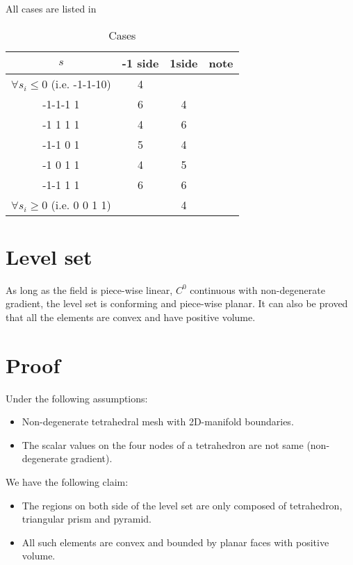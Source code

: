 \documentclass[9pt]{extarticle}
\begin{document}
All cases are listed in~

\begin{table}[htb]
  \centering
  \begin{tabular}{|c|ccc|}
    \hline
    $s$                                 & -1 side & 1side & note \\
    \hline
    $\forall s_i \leq 0$ (i.e. -1-1-10) & 4       &       &      \\
    \hline
    -1-1-1 1                            & 6       & 4     &      \\
    -1 1 1 1                            & 4       & 6     &      \\
    \hline
    -1-1 0 1                            & 5       & 4     &      \\
    -1 0 1 1                            & 4       & 5     &      \\
    \hline
    -1-1 1 1                            & 6       & 6     &      \\
    \hline
    $\forall s_i \geq 0$ (i.e. 0 0 1 1) &         & 4     &      \\
    \hline
  \end{tabular}
  \caption{Cases}
  \label{tab:cases}
\end{table}

\section{Level set}

As long as the field is piece-wise linear, $C^0$ continuous with
non-degenerate gradient, the level set is conforming and piece-wise
planar.  It can also be proved that all the elements are convex and
have positive volume.

\section{Proof}
\label{sec:proof}

Under the following assumptions:
\begin{itemize}
  \item Non-degenerate tetrahedral mesh with 2D-manifold boundaries.
  \item The scalar values on the four nodes of a tetrahedron are not
        same (non-degenerate gradient).
\end{itemize}

We have the following claim:
\begin{itemize}
  \item The regions on both side of the level set are only composed of
        tetrahedron, triangular prism and pyramid.
  \item All such elements are convex and bounded by planar faces with
        positive volume.
\end{itemize}
\end{document}
